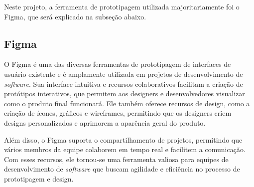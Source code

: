 Neste projeto, a ferramenta de prototipagem utilizada majoritariamente foi o Figma, que será explicado na subseção abaixo.
\subsection{Figma}\label{ssec:figma}
O Figma é uma das diversas ferramentas de prototipagem de interfaces de usuário existente e é amplamente utilizada em projetos de desenvolvimento de \textit{software}. Sua interface intuitiva e recursos colaborativos facilitam a criação de protótipos interativos, que permitem aos designers e desenvolvedores visualizar como o produto final funcionará. Ele também oferece recursos de design, como a criação de ícones, gráficos e wireframes, permitindo que os designers criem designs personalizados e aprimorem a aparência geral do produto. 

Além disso, o Figma suporta o compartilhamento de projetos, permitindo que vários membros da equipe colaborem em tempo real e facilitem a comunicação. Com esses recursos, ele tornou-se uma ferramenta valiosa para equipes de desenvolvimento de \textit{software} que buscam agilidade e eficiência no processo de prototipagem e design.

